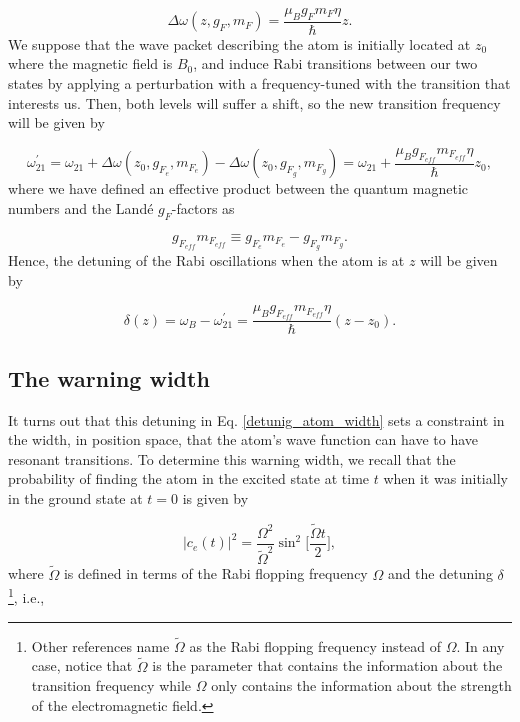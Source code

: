 \documentclass{article}
\begin{document}
\begin{equation}
  \Delta \omega(z, g_{F}, m_{F}) = \frac{\mu_{B} g_{F} m_{F} \eta}{\hbar} z.
\end{equation}
%
We suppose that the wave packet describing the atom is initially located at $z_{0}$ where the magnetic field is $B_{0}$, and induce Rabi transitions between our two states by applying a perturbation with a frequency-tuned with the transition that interests us. Then, both levels will suffer a shift, so the new transition frequency will be given by 

\begin{equation}
  \omega_{21}^{\prime} = \omega_{21} + \Delta \omega(z_{0}, g_{F_{e}}, m_{F_{e}}) -  \Delta \omega(z_{0}, g_{F_{g}}, m_{F_{g}}) =  \omega_{21} + \frac{\mu_{B} g_{F_{eff}} m_{F_{eff}} \eta}{\hbar} z_{0},
\end{equation}
%
where we have defined an effective product between the quantum magnetic numbers and the Landé $g_{F}$-factors as

\begin{equation}\label{detuning}
    g_{F_{eff}} m_{F_{eff}} \equiv g_{F_{e}} m_{F_{e}} - g_{F_{g}} m_{F_{g}}.
\end{equation}
%
Hence, the detuning of the Rabi oscillations when the atom is at $z$ will be given by

\begin{equation}\label{detunig_atom_width}
  \delta (z) = \omega_{B} - \omega_{21}^{\prime} = \frac{\mu_{B} g_{F_{eff}} m_{F_{eff}} \eta}{\hbar} (z-z_{0}).
\end{equation}

\subsection{The warning width}
It turns out that this detuning in Eq. \ref{detunig_atom_width} sets a constraint in the width, in position space, that the atom's wave function can have to have resonant transitions. To determine this warning width, we recall that the probability of finding the atom in the excited state at time $t$ when it was initially in the ground state at $t=0$ is given by \cite{sakurai2017modern}

\begin{equation}\label{rabi_oscillations_exact}
  |c_{e}(t)|^{2} =\frac{\Omega^{2}}{\tilde{\Omega}^{2}} \sin^{2}\bigg[\frac{\tilde{\Omega} t}{2} \bigg],
\end{equation}
%
where $\tilde{\Omega}$ is defined in terms of the Rabi flopping frequency $\Omega$ and the detuning $\delta$\footnote{Other references name $\tilde{\Omega}$ as the Rabi flopping frequency instead of $\Omega$. In any case, notice that $\tilde{\Omega}$ is the parameter that contains the information about the transition frequency while $\Omega$ only contains the information about the strength of the electromagnetic field.}, i.e.,
\end{document}
